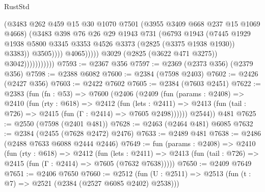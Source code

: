 \begin{lexlean}{RustStd}
\begin{coremodule}
                                        (@3483
                                          @262
                                          @459
                                          @15
                                          @30
                                          @1070
                                          @7501
                                          (@3955 @3409 @668 @237 @15 @1069 @4668)
                                          (@3483
                                            @398
                                            @76
                                            @26
                                            @29
                                            @1943
                                            @731
                                            (@6793
                                              @1943
                                              (@7445
                                                @1929
                                                @1938
                                                @5800
                                                @3345
                                                @3353
                                                @4526
                                                @3373
                                                (@2825 (@3375 @1938 @1930))
                                                @3383))
                                            @3505))))
                                    @4065)))))
                          @3029
                          (@2825 (@3622 @471 @3275))
                          @3042)))))))))))
@7593 := @2367 @356
@7597 := @2369 (@2373 @356) (@2379 @356)
@7598 := @2388 @6082
@7600 := @2384 (@7598 @2403)
@7602 := @2426 (@2427 @356)
@7603 := @2422 @7602
@7605 := @2384 (@7603 @2451)
@7622 := @2383
    (fun (fn : @53) =>
    @7600
      (@2406
        (@2409
          (fun (params : @2408) =>
          @2410
            (fun (rty : @618) =>
            @2412
              (fun (lets : @2411) =>
              @2413 (fun (tail : @726) => @2415 (fun (Γ : @2414) => @7605 @2498))))))
        @2544))
    @481
@7625 := @2550 (@7598 (@2401 @481))
@7628 := @2463 (@2464 @481) @6085
@7632 := @2384 (@2455 (@7628 @2472) @2476)
@7633 := @2489 @481
@7638 := @2486 (@2488 @7633 @6088 @2444 @2446)
@7649 := fun (params : @2408) =>
  @2410
    (fun (rty : @618) =>
    @2412
      (fun (lets : @2411) =>
      @2413 (fun (tail : @726) => @2415 (fun (Γ : @2414) => @7605 (@7632 @7638)))))
@7650 := @2409 @7649
@7651 := @2406 @7650
@7660 := @2512 (fun (U : @2511) => @2513 (fun (t : @7) => @2521 (@2384 (@2527 @6085 @2402) @2538)))

\end{coremodule}
\end{lexlean}
